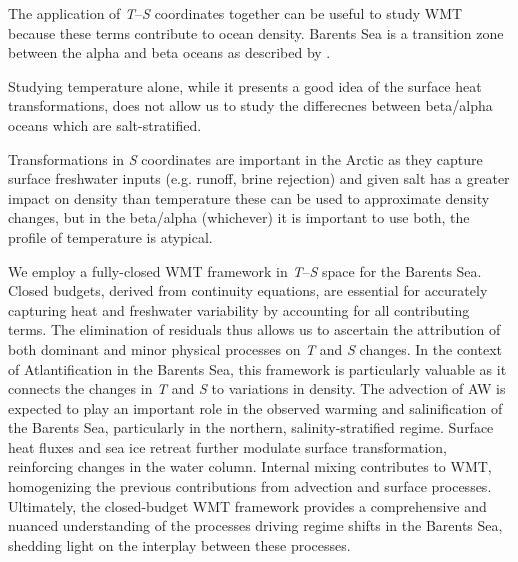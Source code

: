 \documentclass[draft]{agujournal2019}
\begin{document}
The application of \emph{T}--\emph{S} coordinates together can be useful to study WMT because these terms contribute to ocean density. Barents Sea is a transition zone between the alpha and beta oceans as described by \cite{Stewart2016}. 

Studying temperature alone, while it presents a good idea of the surface heat transformations, does not allow us to study the differecnes between beta/alpha oceans which are salt-stratified.

Transformations in \emph{S} coordinates are important in the Arctic as they capture surface freshwater inputs (e.g. runoff, brine rejection) and given salt has a greater impact on density than temperature these can be used to approximate density changes, but in the beta/alpha (whichever) it is important to use both, the profile of temperature is atypical. 




We employ a fully-closed WMT framework in \emph{T}--\emph{S} space for the Barents Sea. Closed budgets, derived from continuity equations, are essential for accurately capturing heat and freshwater variability by accounting for all contributing terms. The elimination of residuals thus allows us to ascertain the attribution of both dominant and minor physical processes on \emph{T} and \emph{S} changes. In the context of Atlantification in the Barents Sea, this framework is particularly valuable as it connects the changes in \emph{T} and \emph{S} to variations in density. The advection of AW is expected to play an important role in the observed warming and salinification of the Barents Sea, particularly in the northern, salinity-stratified regime. Surface heat fluxes and sea ice retreat further modulate surface transformation, reinforcing changes in the water column. Internal mixing contributes to WMT, homogenizing the previous contributions from advection and surface processes. Ultimately, the closed-budget WMT framework provides a comprehensive and nuanced understanding of the processes driving regime shifts in the Barents Sea, shedding light on the interplay between these processes.
\end{document}
